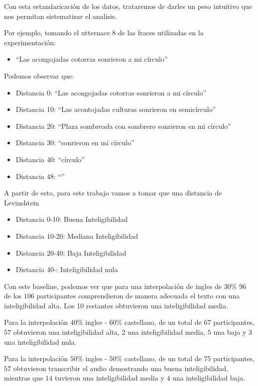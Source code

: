 Con esta estandaricación de los datos, trataremos de darles un peso intuitivo que nos permitan sistematizar el analisis.

Por ejemplo, tomando el utternace $8$ de las fraces utilizadas en la experimentación: 

\begin{itemize}
	\item ``Las acongojadas cotorras sonrieron a mi círculo''
\end{itemize}

Podemos observar que:

\begin{itemize}
	\item Distancia 0: ``Las acongojadas cotorras sonrieron a mi círculo''
	\item Distancia 10: ``Las acontojadas culturas sonrieron en semicírculo''
	\item Distancia 20: ``Plaza sombreada con sombrero sonrieron en mi círculo''
	\item Distancia 30: ``sonrieron en mi círculo''
	\item Distancia 40: ``círculo''
	\item Distancia 48: ``''
\end{itemize}

A partir de esto, para este trabajo vamos a tomar que una distancia de Levinshtein

\begin{itemize}
	\item Distancia 0-10: Buena Inteligibilidad
	\item Distancia 10-20: Mediana Inteligibilidad
	\item Distancia 20-40: Baja Inteligibilidad
	\item Distancia 40-: Inteligibilidad nula
\end{itemize}


Con este baseline, podemos ver que para una interpolación de ingles de $30\%$ 96 de los $106$ participantes comprendieron de manera adecuada el texto con una inteligibilidad alta. Los 10 restantes obtuvieron una inteligibilidad media. 

Para la interpolación $40\%$ ingles - $60\%$ castellano, de un total de $67$ participantes, $57$ obtuvieron una inteligibilidad alta, $2$ una inteligibilidad media, $5$ una baja y 3 una inteligibilidad nula.

Para la interpolación $50\%$ ingles - $50\%$ castellano, de un total de $75$ participantes, $57$ obtuvieron transcribir el audio demostrando una buena inteligibilidad, mientras que $14$ tuvieron una inteligibilidad media y $4$ una inteligibilidad baja.

